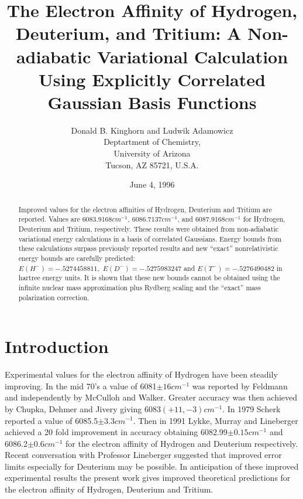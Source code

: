 \documentclass[12pt,thmsa]{article}
\begin{document}
\author{Donald B. Kinghorn and Ludwik Adamowicz \\
Deptartment of Chemistry, \\
University of Arizona \\
Tucson, AZ 85721, U.S.A.}
\title{The Electron Affinity of Hydrogen, Deuterium, and Tritium: A Non-adiabatic
Variational Calculation Using Explicitly Correlated Gaussian Basis Functions}
\date{June 4, 1996}
\maketitle

\begin{abstract}
Improved values for the electron affinities of Hydrogen, Deuterium and
Tritium are reported. Values are 6083.9168$cm^{-1}$, 6086.7137$cm^{-1}$, and
6087.9168$cm^{-1}$ for Hydrogen, Deuterium and Tritium, respectively. These
results were obtained from non-adiabatic variational energy calculations in
a basis of correlated Gaussians. Energy bounds from these calculations
surpass previously reported results and new ``exact'' nonrelativistic energy
bounds are carefully predicted: $E\left( H^{-}\right)
=-.5274458811,\,\,E\left( D^{-}\right) =-.5275983247$ and $E\left(
T^{-}\right) =-.5276490482$ in hartree energy units. It is shown that these
new bounds cannot be obtained using the infinite nuclear mass approximation
plus Rydberg scaling and the ``exact'' mass polarization correction.
\end{abstract}

\section{Introduction}

Experimental values for the electron affinity of Hydrogen have been steadily
improving. In the mid 70's a value of 6081$\pm 16cm^{-1}$ was reported by
Feldmann\cite{Feldmann75} and independently by McCulloh and Walker\cite
{McCulloh74}. Greater accuracy was then achieved by Chupka, Dehmer and Jivery%
\cite{Chupka75} giving 6083$\left( +11,-3\right) cm^{-1}$. In 1979 Scherk%
\cite{Scherk79} reported a value of 6085.5$\pm 3.3cm^{-1}$. Then in 1991
Lykke, Murray and Lineberger\cite{Lykke91} achieved a 20 fold improvement in
accuracy obtaining 6082.99$\pm 0.15cm^{-1}$ and 6086.2$\pm 0.6cm^{-1}$ for
the electron affinity of Hydrogen and Deuterium respectively. Recent
conversation with Professor Lineberger suggested that improved error limits
especially for Deuterium may be possible. In anticipation of these improved
experimental results  the present work gives improved theoretical
predictions for the electron affinity of Hydrogen, Deuterium and Tritium. 
\end{document}
